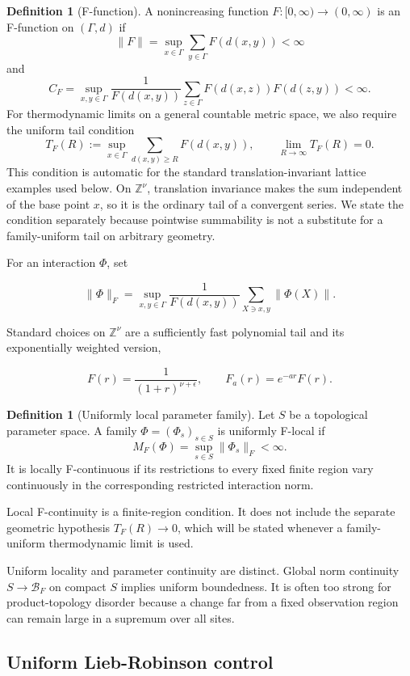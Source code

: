 \documentclass[12pt]{article}
\theoremstyle{definition}
\newtheorem{definition}[theorem]{Definition}
\theoremstyle{remark}
\begin{document}
\begin{definition}[F-function]
A nonincreasing function $F:[0,\infty)\to(0,\infty)$ is an F-function on
$(\Gamma,d)$ if
\[
\|F\|
=
\sup_{x\in\Gamma}\sum_{y\in\Gamma}F(d(x,y))
<\infty
\]
and
\[
C_F
=
\sup_{x,y\in\Gamma}
\frac{1}{F(d(x,y))}
\sum_{z\in\Gamma}F(d(x,z))F(d(z,y))
<\infty.
\]
For thermodynamic limits on a general countable metric space, we also require
the uniform tail condition
\[
T_F(R):=
\sup_{x\in\Gamma}
\sum_{d(x,y)\geq R}F(d(x,y))
,\qquad
\lim_{R\to\infty}T_F(R)=0.
\]
This condition is automatic for the standard translation-invariant lattice
examples used below. On $\mathbb Z^\nu$, translation invariance makes the sum
independent of the base point $x$, so it is the ordinary tail of a convergent
series. We state the condition separately because pointwise summability is not
a substitute for a family-uniform tail on arbitrary geometry.
\end{definition}

For an interaction $\Phi$, set

\[
\|\Phi\|_F
=
\sup_{x,y\in\Gamma}
\frac{1}{F(d(x,y))}
\sum_{X\ni x,y}\|\Phi(X)\|.
\]

Standard choices on $\mathbb Z^\nu$ are a sufficiently fast polynomial tail
and its exponentially weighted version,

\[
F(r)=\frac{1}{(1+r)^{\nu+\epsilon}},
\qquad
F_a(r)=e^{-ar}F(r).
\]

\begin{definition}[Uniformly local parameter family]
Let $S$ be a topological parameter space. A family
$\Phi=(\Phi_s)_{s\in S}$ is uniformly F-local if
\[
M_F(\Phi)=\sup_{s\in S}\|\Phi_s\|_F<\infty.
\]
It is locally F-continuous if its restrictions to every fixed finite region
vary continuously in the corresponding restricted interaction norm.
\end{definition}

Local F-continuity is a finite-region condition. It does not include the
separate geometric hypothesis $T_F(R)\to0$, which will be stated whenever a
family-uniform thermodynamic limit is used.

Uniform locality and parameter continuity are distinct. Global norm
continuity $S\to\mathcal B_F$ on compact $S$ implies uniform boundedness. It
is often too strong for product-topology disorder because a change far from a
fixed observation region can remain large in a supremum over all sites.

\subsection{Uniform Lieb-Robinson control}
\end{document}
